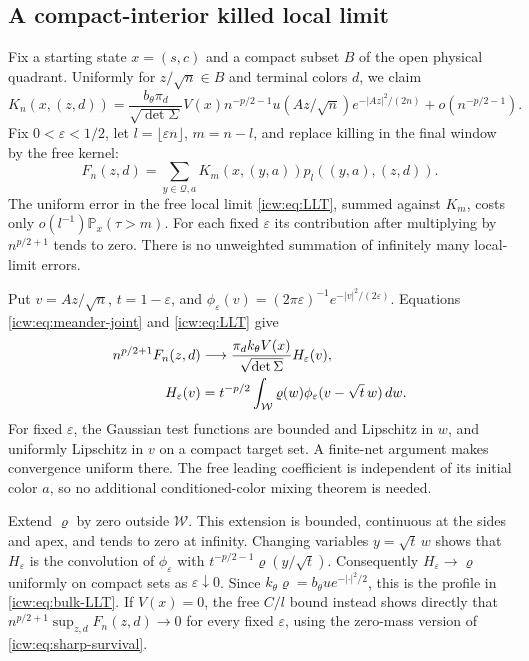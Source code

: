 \documentclass[11pt,letterpaper]{article}
\theoremstyle{remark}\newtheorem{remark}[theorem]{Remark}
\newcommand{\eps}{\varepsilon}
\newcommand{\Prob}{\mathbb P}
\newcommand{\Qd}{\mathcal Q}
\newcommand{\1}{\mathbf1}
\newcommand{\Wedge}{\mathcal W}
\newcommand{\dett}{\sqrt{\det\Sigma}}
\begin{document}
\subsection{A compact-interior killed local limit}
Fix a starting state $x=(s,c)$ and a compact subset $B$ of the open
physical quadrant. Uniformly for $z/\sqrt n\in B$ and terminal colors
$d$, we claim
\begin{equation}\label{icw:eq:bulk-LLT}
 K_n(x,(z,d))=
 \frac{b_\theta\pi_d}{\dett}V(x)n^{-p/2-1}
 u(Az/\sqrt n)e^{-|Az|^2/(2n)}+o(n^{-p/2-1}).
\end{equation}
Fix $0<\eps<1/2$, let $l=\lfloor\eps n\rfloor$, $m=n-l$, and
replace killing in the final window by the free kernel:
\begin{equation}\label{icw:eq:F-smooth}
 F_n(z,d)=\sum_{y\in\Qd,a}K_m(x,(y,a))p_l((y,a),(z,d)).
\end{equation}
The uniform error in the free local limit \eqref{icw:eq:LLT}, summed
against $K_m$, costs only $o(l^{-1})\Prob_x(\tau>m)$.
For each fixed $\eps$ its contribution after multiplying by
$n^{p/2+1}$ tends to zero. There is no unweighted summation of infinitely
many local-limit errors.

Put $v=Az/\sqrt n$, $t=1-\eps$, and
$\phi_\eps(v)=(2\pi\eps)^{-1}e^{-|v|^2/(2\eps)}$.
Equations \eqref{icw:eq:meander-joint} and \eqref{icw:eq:LLT} give
\begin{align}\label{icw:eq:convolution}
 n^{p/2+1}F_n(z,d)&\longrightarrow
   \frac{\pi_d k_\theta V(x)}{\dett}H_\eps(v),\notag\\
 H_\eps(v)&=t^{-p/2}\int_{\Wedge}\varrho(w)
                         \phi_\eps(v-\sqrt t\,w)\,dw.
\end{align}
For fixed $\eps$, the Gaussian test functions are bounded and Lipschitz
in $w$, and uniformly Lipschitz in $v$ on a compact target set.
A finite-net argument makes convergence uniform there. The free leading
coefficient is independent of its initial color $a$, so no additional
conditioned-color mixing theorem is needed.

Extend $\varrho$ by zero outside $\Wedge$. This extension is bounded,
continuous at the sides and apex, and tends to zero at infinity.
Changing variables $y=\sqrt t\,w$ shows that $H_\eps$ is the
convolution of $\phi_\eps$ with
$t^{-p/2-1}\varrho(y/\sqrt t)$. Consequently $H_\eps\to\varrho$
uniformly on compact sets as $\eps\downarrow0$. Since
$k_\theta\varrho=b_\theta u e^{-|\cdot|^2/2}$, this is the profile
in \eqref{icw:eq:bulk-LLT}. If $V(x)=0$, the free $C/l$ bound instead
shows directly that
$n^{p/2+1}\sup_{z,d}F_n(z,d)\to0$ for every fixed $\eps$, using
the zero-mass version of \eqref{icw:eq:sharp-survival}.
\end{document}
